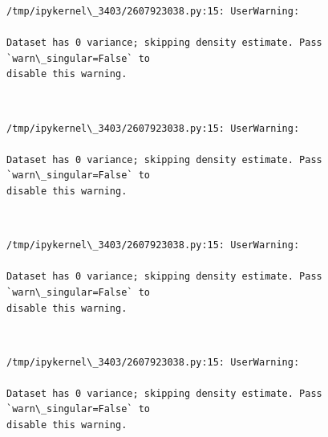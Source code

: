 \documentclass[11pt]{article}
\begin{document}
    \begin{Verbatim}[commandchars=\\\{\}]
/tmp/ipykernel\_3403/2607923038.py:15: UserWarning:

Dataset has 0 variance; skipping density estimate. Pass `warn\_singular=False` to
disable this warning.

    \end{Verbatim}

    \begin{center}
    \end{center}
    { \hspace*{\fill} \\}
    
    \begin{Verbatim}[commandchars=\\\{\}]
/tmp/ipykernel\_3403/2607923038.py:15: UserWarning:

Dataset has 0 variance; skipping density estimate. Pass `warn\_singular=False` to
disable this warning.

    \end{Verbatim}

    \begin{center}
    \end{center}
    { \hspace*{\fill} \\}
    
    \begin{Verbatim}[commandchars=\\\{\}]
/tmp/ipykernel\_3403/2607923038.py:15: UserWarning:

Dataset has 0 variance; skipping density estimate. Pass `warn\_singular=False` to
disable this warning.

    \end{Verbatim}

    \begin{center}
    \end{center}
    { \hspace*{\fill} \\}
    
    \begin{Verbatim}[commandchars=\\\{\}]
/tmp/ipykernel\_3403/2607923038.py:15: UserWarning:

Dataset has 0 variance; skipping density estimate. Pass `warn\_singular=False` to
disable this warning.

    \end{Verbatim}
\end{document}
